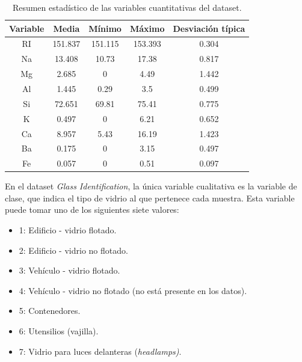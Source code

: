 \documentclass{article}
\begin{document}
\begin{table}[H]
    \centering
    \caption{Resumen estadístico de las variables cuantitativas del dataset.}
    \label{tab:estadisticos}
    \begin{tabular}{|c|c|c|c|c|}
        \hline
        \textbf{Variable} & \textbf{Media} & \textbf{Mínimo} & \textbf{Máximo} & \textbf{Desviación típica} \\
        \hline
        RI  &        151.837       &     151.115          &     153.393          & 0.304                    \\
        \hline
        Na  &       13.408        &     10.73          &    17.38           &    0.817                \\
        \hline
        Mg  &        2.685       &    0           &    4.49           &    1.442                \\
        \hline
        Al  &       1.445        &   0.29            &    3.5           &   0.499                 \\
        \hline
        Si  &      72.651         &   69.81            &   75.41            &    0.775                \\
        \hline
        K   &   0.497            &    0           &     6.21          &      0.652              \\
        \hline
        Ca  &      8.957         &    5.43           &   16.19            &   1.423                 \\
        \hline
        Ba  &      0.175         &    0           &     3.15          &      0.497              \\
        \hline
        Fe  &      0.057         &    0           &     0.51          &      0.097              \\
        \hline
    \end{tabular}
\end{table}



En el dataset \textit{Glass Identification}, la única variable cualitativa es la variable de clase, que indica el tipo de vidrio al que pertenece cada muestra. Esta variable puede tomar uno de los siguientes siete valores:

\begin{itemize}
    \item 1: Edificio - vidrio flotado.
    \item 2: Edificio - vidrio no flotado.
    \item 3: Vehículo - vidrio flotado.
    \item 4: Vehículo - vidrio no flotado (no está presente en los datos).
    \item 5: Contenedores.
    \item 6: Utensilios (vajilla).
    \item 7: Vidrio para luces delanteras (\textit{headlamps)}.
\end{itemize}
\end{document}
